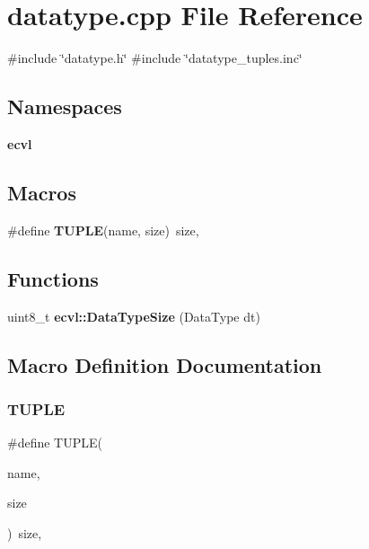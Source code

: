 \section{datatype.\+cpp File Reference}
\label{datatype_8cpp}
{\ttfamily \#include \char`\"{}datatype.\+h\char`\"{}}\newline
{\ttfamily \#include \char`\"{}datatype\+\_\+tuples.\+inc\char`\"{}}\newline
\subsection*{Namespaces}
\begin{DoxyCompactItemize}
\item 
 \textbf{ ecvl}
\end{DoxyCompactItemize}
\subsection*{Macros}
\begin{DoxyCompactItemize}
\item 
\#define \textbf{ T\+U\+P\+LE}(name,  size)~size,
\end{DoxyCompactItemize}
\subsection*{Functions}
\begin{DoxyCompactItemize}
\item 
uint8\+\_\+t \textbf{ ecvl\+::\+Data\+Type\+Size} (Data\+Type dt)
\end{DoxyCompactItemize}


\subsection{Macro Definition Documentation}
\mbox{\label{datatype_8cpp_a53188e9f90fa65ea3cfdd52151b550cc}} 
\subsubsection{TUPLE}
{\footnotesize\ttfamily \#define T\+U\+P\+LE(\begin{DoxyParamCaption}\item[{}]{name,  }\item[{}]{size }\end{DoxyParamCaption})~size,}


